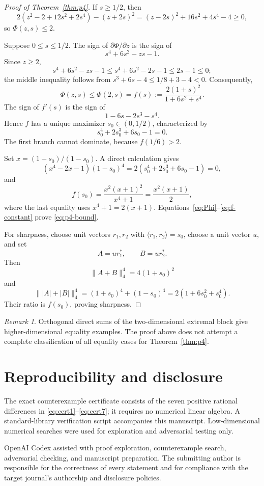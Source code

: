 \documentclass[11pt,reqno]{amsart}
\theoremstyle{remark}
\newtheorem{remark}[theorem]{Remark}
\begin{document}
\begin{proof}[Proof of Theorem~\ref{thm:p4}]
If \(s\ge1/2\), then
\[
 2(z^2-2+12s^2+2s^4)-(z+2s)^2
 =
 (z-2s)^2+16s^2+4s^4-4\ge0,
\]
so \(\Phi(z,s)\le2\).

Suppose \(0\le s\le1/2\).  The sign of
\(\partial\Phi/\partial z\) is the sign of
\[
 s^4+6s^2-zs-1.
\]
Since \(z\ge2\),
\[
 s^4+6s^2-zs-1
 \le s^4+6s^2-2s-1
 \le2s-1\le0;
\]
the middle inequality follows from
\(s^3+6s-4\le1/8+3-4<0\).
Consequently,
\begin{equation}\label{eq:f-s}
 \Phi(z,s)\le\Phi(2,s)
 =
 f(s):=\frac{2(1+s)^2}{1+6s^2+s^4}.
\end{equation}
The sign of \(f'(s)\) is the sign of
\[
 1-6s-2s^3-s^4.
\]
Hence \(f\) has a unique maximizer \(s_0\in(0,1/2)\), characterized by
\begin{equation}\label{eq:s0}
 s_0^4+2s_0^3+6s_0-1=0.
\end{equation}
The first branch cannot dominate, because \(f(1/6)>2\).

Set \(x=(1+s_0)/(1-s_0)\).  A direct calculation gives
\[
 (x^4-2x-1)(1-s_0)^4
 =
 2(s_0^4+2s_0^3+6s_0-1)=0,
\]
and
\begin{equation}\label{eq:f-constant}
 f(s_0)
 =
 \frac{x^2(x+1)^2}{x^4+1}
 =
 \frac{x^2(x+1)}2,
\end{equation}
where the last equality uses \(x^4+1=2(x+1)\).
Equations~\eqref{eq:Phi}--\eqref{eq:f-constant} prove
\eqref{eq:p4-bound}.

For sharpness, choose unit vectors \(r_1,r_2\) with
\(\langle r_1,r_2\rangle=s_0\), choose a unit vector \(u\), and set
\[
 A=ur_1^*,\qquad B=ur_2^*.
\]
Then
\[
 \|A+B\|_4^4=4(1+s_0)^2
\]
and
\[
 \||A|+|B|\|_4^4
 =(1+s_0)^4+(1-s_0)^4
 =2(1+6s_0^2+s_0^4).
\]
Their ratio is \(f(s_0)\), proving sharpness.
\end{proof}

\begin{remark}
Orthogonal direct sums of the two-dimensional extremal block give
higher-dimensional equality examples.  The proof above does not attempt a
complete classification of all equality cases for Theorem~\ref{thm:p4}.
\end{remark}

\section*{Reproducibility and disclosure}

The exact counterexample certificate consists of the seven positive rational
differences in \eqref{eq:cert1}--\eqref{eq:cert7}; it requires no numerical
linear algebra.  A standard-library verification script accompanies this
manuscript.  Low-dimensional numerical searches were used for exploration and
adversarial testing only.

OpenAI Codex assisted with proof exploration, counterexample search,
adversarial checking, and manuscript preparation.  The submitting author is
responsible for the correctness of every statement and for compliance with
the target journal's authorship and disclosure policies.



\end{document}
